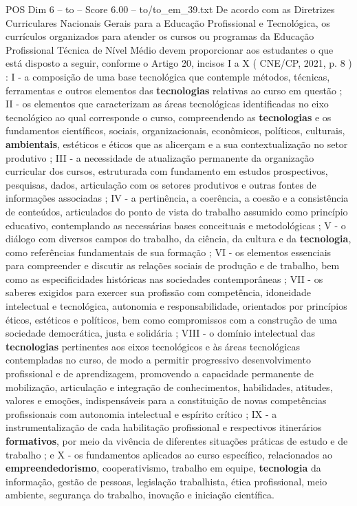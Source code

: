 \begin{textsample}{POS Dim 6 – to – Score 6.00 – to/to\_em\_39.txt}
De acordo com as Diretrizes Curriculares Nacionais Gerais para a Educação Profissional e Tecnológica, os currículos organizados para atender os cursos ou programas da Educação Profissional Técnica de Nível Médio devem proporcionar aos estudantes o que está disposto a seguir, conforme o Artigo 20, incisos I a X ( CNE/CP, 2021, p. 8 ) : I - a composição de uma base tecnológica que contemple métodos, técnicas, ferramentas e outros elementos das \textbf{tecnologias} relativas ao curso em questão ; II - os elementos que caracterizam as áreas tecnológicas identificadas no eixo tecnológico ao qual corresponde o curso, compreendendo as \textbf{tecnologias} e os fundamentos científicos, sociais, organizacionais, econômicos, políticos, culturais, \textbf{ambientais}, estéticos e éticos que as alicerçam e a sua contextualização no setor produtivo ; III - a necessidade de atualização permanente da organização curricular dos cursos, estruturada com fundamento em estudos prospectivos, pesquisas, dados, articulação com os setores produtivos e outras fontes de informações associadas ; IV - a pertinência, a coerência, a coesão e a consistência de conteúdos, articulados do ponto de vista do trabalho assumido como princípio educativo, contemplando as necessárias bases conceituais e metodológicas ; V - o diálogo com diversos campos do trabalho, da ciência, da cultura e da \textbf{tecnologia}, como referências fundamentais de sua formação ; VI - os elementos essenciais para compreender e discutir as relações sociais de produção e de trabalho, bem como as especificidades históricas nas sociedades contemporâneas ; VII - os saberes exigidos para exercer sua profissão com competência, idoneidade intelectual e tecnológica, autonomia e responsabilidade, orientados por princípios éticos, estéticos e políticos, bem como compromissos com a construção de uma sociedade democrática, justa e solidária ; VIII - o domínio intelectual das \textbf{tecnologias} pertinentes aos eixos tecnológicos e às áreas tecnológicas contempladas no curso, de modo a permitir progressivo desenvolvimento profissional e de aprendizagem, promovendo a capacidade permanente de mobilização, articulação e integração de conhecimentos, habilidades, atitudes, valores e emoções, indispensáveis para a constituição de novas competências profissionais com autonomia intelectual e espírito crítico ; IX - a instrumentalização de cada habilitação profissional e respectivos itinerários \textbf{formativos}, por meio da vivência de diferentes situações práticas de estudo e de trabalho ; e X - os fundamentos aplicados ao curso específico, relacionados ao \textbf{empreendedorismo}, cooperativismo, trabalho em equipe, \textbf{tecnologia} da informação, gestão de pessoas, legislação trabalhista, ética profissional, meio ambiente, segurança do trabalho, inovação e iniciação científica.

\end{textsample}
